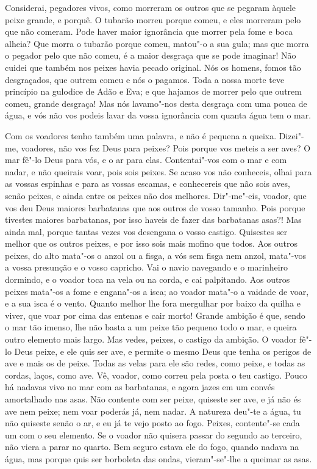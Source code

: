 Considerai, pegadores vivos, como morreram os outros que se pegaram
àquele peixe grande, e porquê. O tubarão morreu porque comeu, e eles
morreram pelo que não comeram. Pode haver maior ignorância que morrer
pela fome e boca alheia? Que morra o tubarão porque comeu, matou"-o a sua
gula; mas que morra o pegador pelo que não comeu, é a maior desgraça que
se pode imaginar! Não cuidei que também nos peixes havia pecado
original. Nós os homens, fomos tão desgraçados, que outrem comeu e nós o
pagamos. Toda a nossa morte teve princípio na gulodice de Adão e Eva; e
que hajamos de morrer pelo que outrem comeu, grande desgraça! Mas nós
lavamo"-nos desta desgraça com uma pouca de água, e vós não vos podeis
lavar da vossa ignorância com quanta água tem o mar.

Com os voadores tenho também uma palavra, e não é pequena a queixa.
Dizei"-me, voadores, não vos fez Deus para peixes? Pois porque vos meteis
a ser aves? O mar fê"-lo Deus para vós, e o ar para elas. Contentai"-vos
com o mar e com nadar, e não queirais voar, pois sois peixes. Se acaso
vos não conheceis, olhai para as vossas espinhas e para as vossas
escamas, e conhecereis que não sois aves, senão peixes, e ainda entre os
peixes não dos melhores. Dir"-me"-eis, voador, que vos deu Deus maiores
barbatanas que aos outros de vosso tamanho. Pois porque tivestes maiores
barbatanas, por isso haveis de fazer das barbatanas asas?! Mas ainda
mal, porque tantas vezes vos desengana o vosso castigo. Quisestes ser
melhor que os outros peixes, e por isso sois mais mofino que todos. Aos
outros peixes, do alto mata"-os o anzol ou a fisga, a vós sem fisga nem
anzol, mata"-vos a vossa presunção e o vosso capricho. Vai o navio
navegando e o marinheiro dormindo, e o voador toca na vela ou na corda,
e cai palpitando. Aos outros peixes mata"-os a fome e engana"-os a isca;
ao voador mata"-o a vaidade de voar, e a sua isca é o vento. Quanto
melhor lhe fora mergulhar por baixo da quilha e viver, que voar por cima
das entenas e cair morto!
Grande ambição é que, sendo o mar tão imenso, lhe não basta a um peixe
tão pequeno todo o mar, e queira outro elemento mais largo. Mas vedes,
peixes, o castigo da ambição. O voador fê"-lo Deus peixe, e ele quis ser
ave, e permite o mesmo Deus que tenha os perigos de ave e mais os de
peixe. Todas as velas para ele são redes, como peixe, e todas as cordas,
laços, como ave. Vê, voador, como correu pela posta o teu castigo. Pouco
há nadavas vivo no mar com as barbatanas, e agora jazes em um convés
amortalhado nas asas. Não contente com ser peixe, quiseste ser ave, e já
não és ave nem peixe; nem voar poderás já, nem nadar. A natureza deu"-te
a água, tu não quiseste senão o ar, e eu já te vejo posto ao fogo.
Peixes, contente"-se cada um com o seu elemento. Se o voador não quisera
passar do segundo ao terceiro, não viera a parar no quarto. Bem seguro
estava ele do fogo, quando nadava na água, mas porque quis ser borboleta
das ondas, vieram"-se"-lhe a queimar as asas.

